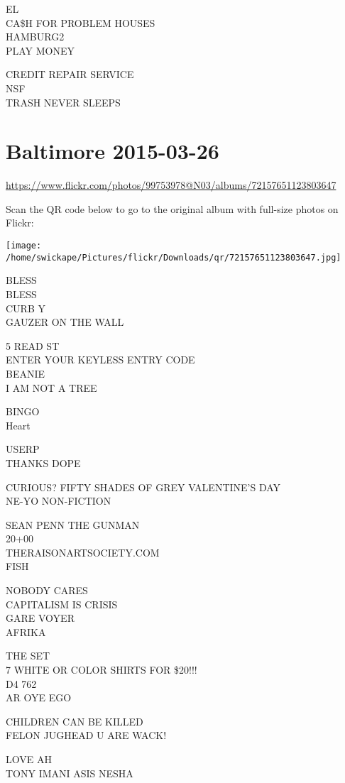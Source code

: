 \documentclass[10pt,letterpaper]{article}
\begin{document}
EL\\
CA\$H FOR PROBLEM HOUSES\\
HAMBURG2\\
PLAY MONEY

CREDIT REPAIR SERVICE\\
NSF\\
TRASH NEVER SLEEPS


\section*{Baltimore 2015-03-26}

\url{https://www.flickr.com/photos/99753978@N03/albums/72157651123803647}

Scan the QR code below to go to the original album with full-size photos on Flickr:

\texttt{[image: /home/swickape/Pictures/flickr/Downloads/qr/72157651123803647.jpg]}


BLESS\\
BLESS\\
CURB Y\\
GAUZER ON THE WALL

5 READ ST\\
ENTER YOUR KEYLESS ENTRY CODE\\
BEANIE\\
I AM NOT A TREE

BINGO\\
Heart

USERP\\
THANKS DOPE

CURIOUS?  FIFTY SHADES OF GREY VALENTINE'S DAY\\
NE{-}YO NON{-}FICTION

SEAN PENN THE GUNMAN\\
20+00\\
THERAISONARTSOCIETY.COM\\
FISH

NOBODY CARES\\
CAPITALISM IS CRISIS\\
GARE VOYER\\
AFRIKA

THE SET\\
7 WHITE OR COLOR SHIRTS FOR \$20!!!\\
D4 762\\
AR OYE EGO

CHILDREN CAN BE KILLED\\
FELON JUGHEAD U ARE WACK!

LOVE AH\\
TONY IMANI ASIS NESHA
\end{document}
